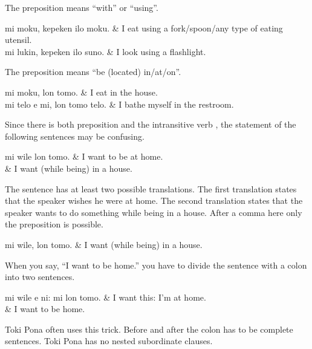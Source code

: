 %
The preposition  means ``with'' or ``using''.

\begin{translationtable}
    mi moku, kepeken ilo moku.  & I eat using a fork/spoon/any type of eating utensil. \\
    mi lukin, kepeken ilo suno. & I look using a flashlight.                           \\
\end{translationtable}
%
%
%
%
%
%
The preposition  means ``be (located) in/at/on''.

\begin{translationtable}
    mi moku, lon tomo.           & I eat in the house.             \\
    mi telo e mi, lon tomo telo. & I bathe myself in the restroom. \\
\end{translationtable}
%
Since there is both preposition  and the intransitive verb , the statement of the following sentences may be confusing.

\begin{translationtable}
    mi wile lon tomo. & I want to be at home.            \\
                      & I want (while being) in a house. \\
\end{translationtable}
%
The sentence has at least two possible translations.
The first translation states that the speaker wishes he were at home.
The second translation states that the speaker wants to do something while being in a house.
After a comma here only the preposition  is possible.

\begin{translationtable}
    mi wile, lon tomo. & I want (while being) in a house. \\
\end{translationtable}
%
When you say, ``I want to be home.'' you have to divide the sentence with a colon into two sentences.

\begin{translationtable}
    mi wile e ni: mi lon tomo. & I want this: I'm at home. \\
                               & I want to be home.        \\
\end{translationtable}
%
Toki Pona often uses this  trick.
Before and after the colon has to be complete sentences.
Toki Pona has no nested subordinate clauses.

